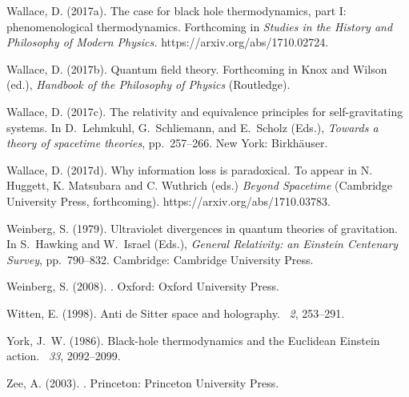 \documentclass[12pt]{article}
\begin{document}
\begin{thebibliography}{}
Wallace, D. (2017a).
\newblock The case for black hole thermodynamics, part {I}: phenomenological
  thermodynamics.
\newblock Forthcoming in \emph{Studies in the History and Philosophy of Modern
  Physics.} https://arxiv.org/abs/1710.02724.

Wallace, D. (2017b).
\newblock Quantum field theory.
\newblock Forthcoming in Knox and Wilson (ed.), \emph{Handbook of the
  Philosophy of Physics} (Routledge).

Wallace, D. (2017c).
\newblock The relativity and equivalence principles for self-gravitating
  systems.
\newblock In D.~Lehmkuhl, G.~Schliemann, and E.~Scholz (Eds.), {\em Towards a
  theory of spacetime theories}, pp.\  257--266. New York: Birkh{\"a}user.

Wallace, D. (2017d).
\newblock Why information loss is paradoxical.
\newblock To appear in N. Huggett, K. Matsubara and C. Wuthrich (eds.)
  \emph{Beyond Spacetime} (Cambridge University Press, forthcoming).
  https://arxiv.org/abs/1710.03783.

Weinberg, S. (1979).
\newblock Ultraviolet divergences in quantum theories of gravitation.
\newblock In S.~Hawking and W.~Israel (Eds.), {\em General Relativity: an
  {E}instein Centenary Survey}, pp.\  790--832. Cambridge: Cambridge University
  Press.

Weinberg, S. (2008).
.
\newblock Oxford: Oxford University Press.

Witten, E. (1998).
\newblock Anti de {S}itter space and holography.
~{\em 2},
  253--291.

York, J.~W. (1986).
\newblock Black-hole thermodynamics and the {E}uclidean {E}instein action.
~{\em 33}, 2092--2099.

Zee, A. (2003).
.
\newblock Princeton: Princeton University Press.

\end{thebibliography}
\end{document}

